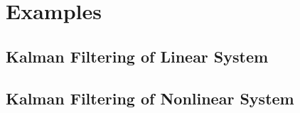 
\appendix               	%
\chapter{Examples} 
\section{Kalman Filtering of Linear System} \label{ExampleKF} 


\section{Kalman Filtering of Nonlinear System} \label{ExampleEKF} 